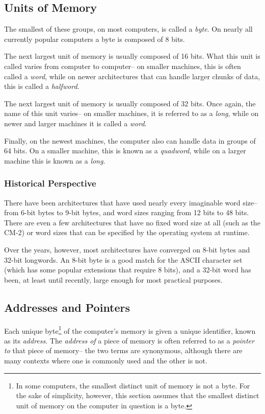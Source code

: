 \subsection{Units of Memory}

The smallest of these groups, on most computers,
is called a {\em byte}.
On nearly all currently popular computers a byte is composed of 8 bits.

The next largest unit of memory is usually composed of
16 bits.  What this unit is called varies from computer
to computer-- on smaller machines, this is often called
a {\em word}, while on newer architectures that
can handle larger chunks of data,
this is called a {\em halfword}.

The next largest unit of memory is usually composed of 32 bits.
Once again, the name of this unit varies-- on smaller machines,
it is referred to as a {\em long}, while
on newer and larger machines it is called a {\em word}.

Finally, on the newest machines, the computer also can handle
data in groups of 64 bits.  On a smaller machine, this is known
as a {\em quadword}, while on a larger machine
this is known as a {\em long}.

\subsubsection{Historical Perspective}

There have been architectures that have used nearly
every imaginable word size-- from 6-bit bytes to 9-bit bytes,
and word sizes ranging from 12 bits to 48 bits.
There are even a few architectures that have no fixed
word size at all (such as the CM-2) or word sizes that
can be specified by the operating system at runtime.

Over the years, however, most architectures have converged
on 8-bit bytes and 32-bit longwords.
An 8-bit byte is a good match for the ASCII character set
(which has some popular extensions that require 8 bits),
and a 32-bit word has been, at least until recently,
large enough for most practical purposes.

\subsection{Addresses and Pointers}

Each unique byte\footnote{
	In some computers, the smallest distinct unit of memory
	is not a byte.  For the sake of simplicity, however,
	this section assumes that the smallest distinct unit
	of memory on the computer in question is a byte.}
of the computer's memory is given a unique identifier, known
as its {\em address}.  The {\em address of} a piece of memory is
often referred to as a {\em pointer to} that piece of memory--
the two terms are synonymous, although there are many contexts
where one is commonly used and the other is not.

